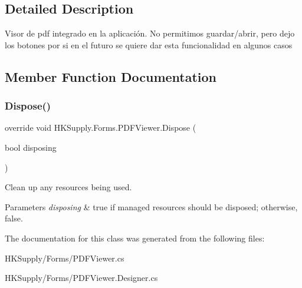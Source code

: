 \subsection{Detailed Description}
Visor de pdf integrado en la aplicación. No permitimos guardar/abrir, pero dejo los botones por si en el futuro se quiere dar esta funcionalidad en algunos casos 



\subsection{Member Function Documentation}
\mbox{\label{class_h_k_supply_1_1_forms_1_1_p_d_f_viewer_ad9b7bf418e85b167b39f97a319e1d561}} 
\subsubsection{\texorpdfstring{Dispose()}{Dispose()}}
{\footnotesize\ttfamily override void H\+K\+Supply.\+Forms.\+P\+D\+F\+Viewer.\+Dispose (\begin{DoxyParamCaption}\item[{bool}]{disposing }\end{DoxyParamCaption})\hspace{0.3cm}{\ttfamily [protected]}}



Clean up any resources being used. 


\begin{DoxyParams}{Parameters}
{\em disposing} & true if managed resources should be disposed; otherwise, false.\\
\hline
\end{DoxyParams}


The documentation for this class was generated from the following files\+:\begin{DoxyCompactItemize}
\item 
H\+K\+Supply/\+Forms/P\+D\+F\+Viewer.\+cs\item 
H\+K\+Supply/\+Forms/P\+D\+F\+Viewer.\+Designer.\+cs\end{DoxyCompactItemize}

